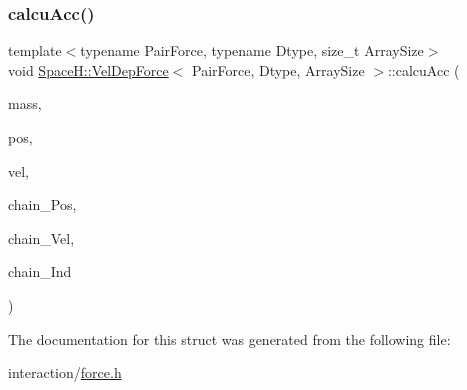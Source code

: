 \subsubsection{\texorpdfstring{calcu\+Acc()}{calcuAcc()}\hspace{0.1cm}{\footnotesize\ttfamily [2/2]}}
{\footnotesize\ttfamily template$<$typename Pair\+Force, typename Dtype, size\+\_\+t Array\+Size$>$ \\
void \mbox{\hyperlink{struct_space_h_1_1_vel_dep_force}{Space\+H\+::\+Vel\+Dep\+Force}}$<$ Pair\+Force, Dtype, Array\+Size $>$\+::calcu\+Acc (\begin{DoxyParamCaption}\item[{const \mbox{\hyperlink{struct_space_h_1_1_vel_dep_force_ae4efbb88779fc063293b7853184378ac}{Scalar\+Array}} \&}]{mass,  }\item[{const \mbox{\hyperlink{struct_space_h_1_1_vel_dep_force_ad2d0301ffff67a74018b92c17a3475de}{Vector\+Array}} \&}]{pos,  }\item[{const \mbox{\hyperlink{struct_space_h_1_1_vel_dep_force_ad2d0301ffff67a74018b92c17a3475de}{Vector\+Array}} \&}]{vel,  }\item[{const \mbox{\hyperlink{struct_space_h_1_1_vel_dep_force_ad2d0301ffff67a74018b92c17a3475de}{Vector\+Array}} \&}]{chain_\+Pos,  }\item[{const \mbox{\hyperlink{struct_space_h_1_1_vel_dep_force_ad2d0301ffff67a74018b92c17a3475de}{Vector\+Array}} \&}]{chain_\+Vel,  }\item[{const \mbox{\hyperlink{struct_space_h_1_1_vel_dep_force_a81473a733ed71f51b81323c705283195}{Index\+Array}} \&}]{chain_\+Ind }\end{DoxyParamCaption})\hspace{0.3cm}{\ttfamily [inline]}}



The documentation for this struct was generated from the following file\+:\begin{DoxyCompactItemize}
\item 
interaction/\mbox{\hyperlink{force_8h}{force.\+h}}\end{DoxyCompactItemize}

